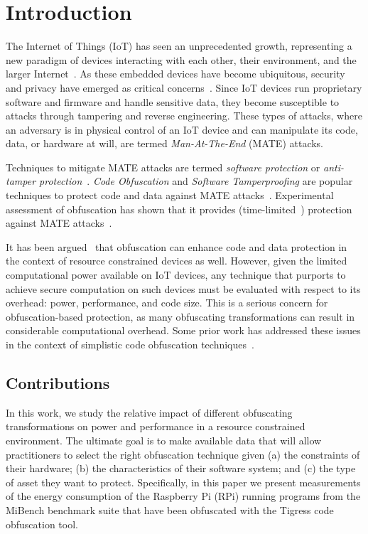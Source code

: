 \section{Introduction}
The Internet of Things (IoT) has seen an unprecedented growth, representing a new paradigm of devices interacting with each other, their environment, and the larger Internet~\cite{ATZORI20102787}. As these embedded devices have become ubiquitous, security and privacy have emerged as critical concerns~\cite{weber2010internet,7054433}. Since IoT devices run proprietary software and firmware and handle sensitive data, they become susceptible to attacks through tampering and reverse engineering. These types of attacks, where an adversary is in physical control of an IoT device and can manipulate its code, data, or hardware at will, are termed {\em Man-At-The-End} (MATE) attacks. 

Techniques to mitigate MATE attacks are termed {\em software protection} or {\em anti-tamper protection}~\cite{falcarin2011guest}. {\em Code Obfuscation} and {\em Software Tamperproofing} are popular techniques to protect code and data against MATE attacks~\cite{collberg_surreptitious_2010}. Experimental assessment of obfuscation has shown that it provides (time-limited~\cite{hohl98time}) protection against MATE attacks~\cite{5090041,7781792}.

It has been argued~\cite{Hosseinzadeh2015} that obfuscation can enhance code and data protection in the context of resource constrained devices as well. However, given the limited computational power available on IoT devices, any technique that purports to achieve secure computation on such devices must be evaluated with respect to its overhead: power, performance, and code size. This is a serious concern for obfuscation-based protection, as many obfuscating transformations can result in considerable computational overhead. Some prior work has addressed these issues in the context of simplistic code obfuscation techniques~\cite{6976079,dhukovic2015load,raj2017modelling}.

\subsection{Contributions}
In this work, we study the relative impact of different obfuscating transformations on power and performance in a resource constrained environment. The ultimate goal is to make available data that will allow practitioners to select the right obfuscation technique given (a) the constraints of their hardware; (b) the characteristics of their software system; and (c) the type of asset they want to protect. Specifically, in this paper we present measurements of the energy consumption of the Raspberry Pi (RPi) running programs from the MiBench benchmark suite that have been obfuscated with the Tigress code obfuscation tool. 

